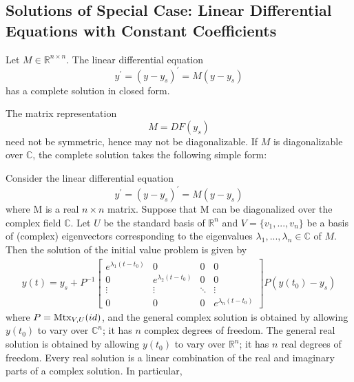 \documentclass[11pt]{elegantbook}
\begin{document}
\subsection{Solutions of Special Case: Linear Differential Equations with Constant Coefficients}
Let $M \in \mathbb{R}^{n\times n}$. The linear differential equation $$
y^{\prime}=\left(y-y_s\right)^{\prime}=M\left(y-y_s\right)
$$
has a complete solution in closed form.

The matrix representation $$M=D F\left(y_s\right)$$
need not be symmetric, hence may not be diagonalizable. If $M$ is diagonalizable over $\mathbb{C}$, the complete solution takes the following simple form:

\begin{theorem}\label{theorem:Solutions of Linear Differential Equations with Constant Coefficients}
    Consider the linear differential equation $$
    y^{\prime}=\left(y-y_s\right)^{\prime}=M\left(y-y_s\right)
    $$
    where M is a real $n\times n$ matrix. Suppose that M can be diagonalized over the complex field $\mathbb{C}$. Let $U$ be the standard basis of $\mathbb{R}^n$ and $V = \{v_1, . . . , v_n\}$ be a basis of (complex) eigenvectors corresponding to the eigenvalues $\lambda_1, . . . , \lambda_n \in \mathbb{C}$ of $M$. Then the solution of the initial value problem is given by
    \begin{equation}
        \begin{aligned}
            y(t)=y_s+P^{-1}\begin{bmatrix}
                e^{\lambda_1(t-t_0)}&0&0&0\\
                0&e^{\lambda_2(t-t_0)}&0&0\\
                \vdots&\vdots&\ddots&\vdots\\
                0&0&0&e^{\lambda_n(t-t_0)}
            \end{bmatrix} P(y(t_0)-y_s)
        \end{aligned}
        \label{Constant Coefficients}
    \end{equation}
    where $P = \textnormal{Mtx}_{V,U}(id)$, and the general complex solution is obtained by allowing $y(t_0)$ to vary over $\mathbb{C}^n$; it has $n$ complex degrees of freedom. The general real solution is obtained by allowing $y(t_0)$ to vary over $\mathbb{R}^n$; it has $n$ real degrees of freedom. Every real solution is a linear combination of the real and imaginary parts of a complex solution. In particular,
    \begin{enumerate}

\end{enumerate}
\end{theorem}
\end{document}
